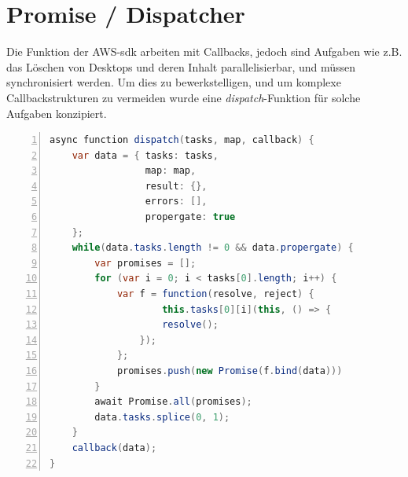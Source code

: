 \documentclass[a4paper, 12pt]{scrreprt}
\renewcommand\_{\textunderscore\allowbreak}
\begin{document}

\section{Promise / Dispatcher}


Die Funktion der AWS-sdk arbeiten mit Callbacks, jedoch sind Aufgaben wie z.B. das Löschen von Desktops und deren Inhalt parallelisierbar, und müssen synchronisiert werden. Um dies zu bewerkstelligen, und um komplexe Callbackstrukturen zu vermeiden wurde eine \textit{dispatch}-Funktion für solche Aufgaben konzipiert. 

\begin{lstlisting}[xleftmargin=\parindent,numbers=left,numberstyle=\small,numbersep=8pt,frame=L,mathescape=true, basicstyle=\small, language=Java, lineskip={1.0pt}]
async function dispatch(tasks, map, callback) {
    var data = { tasks: tasks,
                 map: map, 
                 result: {}, 
                 errors: [], 
                 propergate: true 
    };
    while(data.tasks.length != 0 && data.propergate) {
        var promises = [];
        for (var i = 0; i < tasks[0].length; i++) {
            var f = function(resolve, reject) {
                    this.tasks[0][i](this, () => {
                    resolve();
                });
            };
            promises.push(new Promise(f.bind(data)))
        }
        await Promise.all(promises);
        data.tasks.splice(0, 1);
    }
    callback(data);
}
\end{lstlisting}
\end{document}
